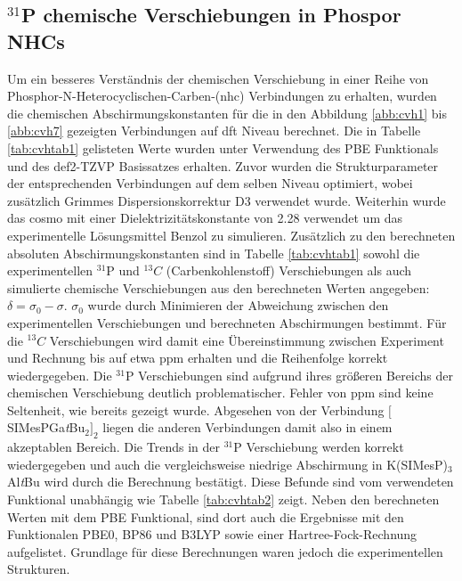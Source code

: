 \subsection{\texorpdfstring{$^{31}$P}{31P} chemische Verschiebungen in Phospor NHCs}
Um ein besseres Verständnis der chemischen Verschiebung in einer Reihe von Phosphor-N-Heterocyclischen-Carben-(\acs{nhc}) Verbindungen \supercite{lemp2017nhc} zu erhalten, wurden die chemischen Abschirmungskonstanten für die in den Abbildung \ref{abb:cvh1} bis \ref{abb:cvh7} gezeigten Verbindungen auf \ac{dft} Niveau berechnet. Die in Tabelle \ref{tab:cvhtab1} gelisteten Werte wurden unter Verwendung des PBE Funktionals\supercite{perdew1996generalized} und des def2-TZVP Basissatzes\supercite{weigend2005balanced} erhalten. Zuvor wurden die Strukturparameter der entsprechenden Verbindungen auf dem selben Niveau optimiert, wobei zusätzlich Grimmes Dispersionskorrektur D3\supercite{grimme2010consistent} verwendet wurde. Weiterhin wurde das \ac{cosmo}\supercite{klamt1993cosmo} mit einer Dielektrizitätskonstante von 2.28 verwendet um das experimentelle Lösungsmittel Benzol zu simulieren. Zusätzlich zu den berechneten absoluten Abschirmungskonstanten sind in Tabelle \ref{tab:cvhtab1} sowohl die experimentellen $^{31}$P und $^{13}C$ (Carbenkohlenstoff) Verschiebungen als auch simulierte chemische Verschiebungen aus den berechneten Werten angegeben: $\delta=\sigma_0-\sigma$. $\sigma_0$ wurde durch Minimieren der Abweichung zwischen den experimentellen Verschiebungen und berechneten Abschirmungen bestimmt. Für die $^{13}C$ Verschiebungen wird damit eine Übereinstimmung zwischen Experiment und Rechnung bis auf etwa \unit[2]{ppm} erhalten und die Reihenfolge korrekt wiedergegeben. Die $^{31}$P Verschiebungen sind aufgrund ihres größeren Bereichs der chemischen Verschiebung deutlich problematischer. Fehler von \unit[30]{ppm} sind keine Seltenheit, wie bereits gezeigt wurde.\supercite{latypov2015quantum,reiter2017calculation} Abgesehen von der Verbindung $[$SIMesPGa\textit{t}Bu$_2]_2$ liegen die anderen Verbindungen damit also in einem akzeptablen Bereich. Die Trends in der $^{31}$P Verschiebung werden korrekt wiedergegeben und auch die vergleichsweise niedrige Abschirmung in K(SIMesP)$_3$Al\textit{t}Bu wird durch die Berechnung bestätigt. Diese Befunde sind vom verwendeten Funktional unabhängig wie Tabelle \ref{tab:cvhtab2} zeigt. Neben den berechneten Werten mit dem PBE Funktional, sind dort auch die Ergebnisse mit den Funktionalen PBE0\supercite{adamo1999toward}, BP86\supercite{perdew1986density,becke1988density} und B3LYP\supercite{becke1993density,lee1988development,stephens1994ab} sowie einer Hartree-Fock-Rechnung aufgelistet. Grundlage für diese Berechnungen waren jedoch die experimentellen Strukturen.

